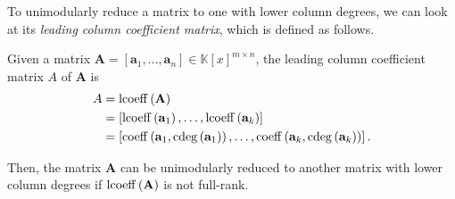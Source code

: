 To unimodularly reduce a matrix to one with lower column degrees,
we can look at its\emph{ leading column coefficient matrix}, which
is defined as follows. 
\begin{defn}
Given a matrix $\mathbf{A}=\left[\mathbf{a}_{1},\dots,\mathbf{a}_{n}\right]\in\mathbb{K}\left[x\right]^{m\times n}$,
the leading column coefficient matrix $A$ of $\mathbf{A}$ is
\begin{align*}
A & =\lcoeff\left(\mathbf{A}\right)\\
 & =\left[\lcoeff\left(\mathbf{a}_{1}\right),\dots,\lcoeff\left(\mathbf{a}_{k}\right)\right]\\
 & =\left[\coeff\left(\mathbf{a}_{1},\cdeg\left(\mathbf{a}_{1}\right)\right),\dots,\coeff\left(\mathbf{a}_{k},\cdeg\left(\mathbf{a}_{k}\right)\right)\right].
\end{align*}

\end{defn}
Then, the matrix $\mathbf{A}$ can be unimodularly reduced to another
matrix with lower column degrees if $\operatorname{lcoeff}\left(\mathbf{A}\right)$
is not full-rank. %
\begin{comment}
In the following, we assume with out loss of generality that matrices
have columns arranged in increasing column degrees. 
\end{comment}

